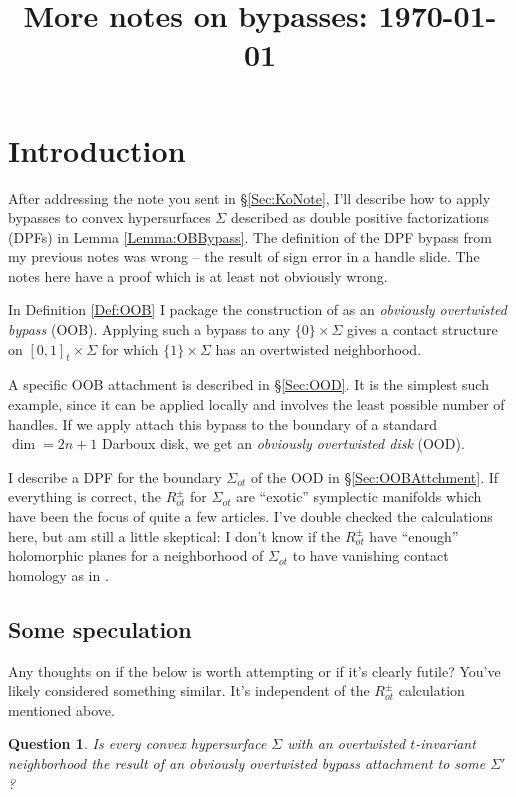 \documentclass[11pt]{amsart}
\title[More notes on bypasses]{More notes on bypasses: \today}
\newtheorem{q}[thm]{Question}
\begin{document}
\maketitle

\section{Introduction}

After addressing the note you sent in \S \ref{Sec:KoNote}, I'll describe how to apply bypasses to convex hypersurfaces $\Sigma$ described as double positive factorizations (DPFs) in Lemma \ref{Lemma:OBBypass}. The definition of the DPF bypass from my previous notes was wrong -- the result of sign error in a handle slide. The notes here have a proof which is at least not obviously wrong.

In Definition \ref{Def:OOB} I package the construction of \cite[\S 10]{HH:Bypass} as an \emph{obviously overtwisted bypass} (OOB). Applying such a bypass to any $\{ 0 \} \times \Sigma$ gives a contact structure on $[0, 1]_{t} \times \Sigma$ for which $\{ 1 \} \times \Sigma$ has an overtwisted neighborhood.

A specific OOB attachment is described in \S \ref{Sec:OOD}. It is the simplest such example, since it can be applied locally and involves the least possible number of handles. If we apply attach this bypass to the boundary of a standard $\dim = 2n+1$ Darboux disk, we get an \emph{obviously overtwisted disk} (OOD).

I describe a DPF for the boundary $\Sigma_{ot}$ of the OOD in \S \ref{Sec:OOBAttchment}. If everything is correct, the $R^{\pm}_{ot}$ for $\Sigma_{ot}$ are ``exotic'' symplectic manifolds which have been the focus of quite a few articles. I've double checked the calculations here, but am still a little skeptical: I don't know if the $R^{\pm}_{ot}$ have ``enough'' holomorphic planes for a neighborhood of $\Sigma_{ot}$ to have vanishing contact homology as in \cite{Avdek:Convex}.

\subsection{Some speculation}

Any thoughts on if the below is worth attempting or if it's clearly futile? You've likely considered something similar. It's independent of the $R^{\pm}_{ot}$ calculation mentioned above.

\begin{q}\label{Q:OTCriterion}
Is every convex hypersurface $\Sigma$ with an overtwisted $t$-invariant neighborhood the result of an obviously overtwisted bypass attachment to some $\Sigma'$?
\end{q}
\end{document}
